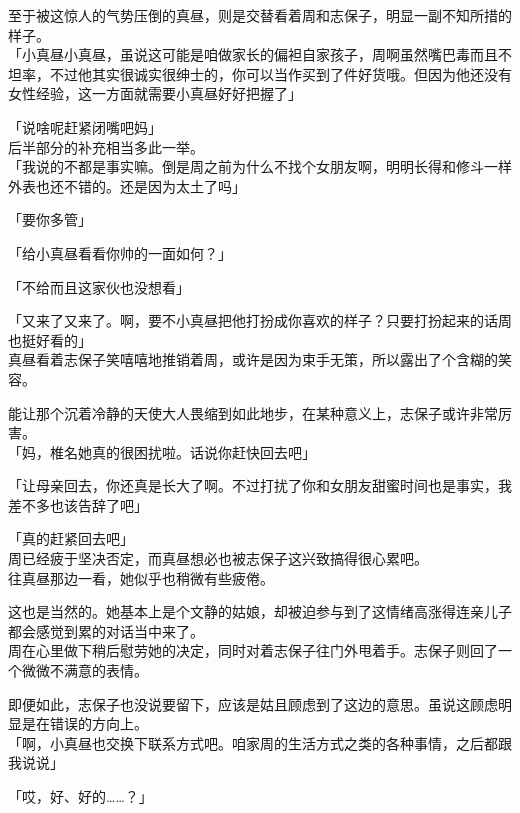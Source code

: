 至于被这惊人的气势压倒的真昼，则是交替看着周和志保子，明显一副不知所措的样子。\\

「小真昼小真昼，虽说这可能是咱做家长的偏袒自家孩子，周啊虽然嘴巴毒而且不坦率，不过他其实很诚实很绅士的，你可以当作买到了件好货哦。但因为他还没有女性经验，这一方面就需要小真昼好好把握了」

「说啥呢赶紧闭嘴吧妈」\\

后半部分的补充相当多此一举。\\

「我说的不都是事实嘛。倒是周之前为什么不找个女朋友啊，明明长得和修斗一样外表也还不错的。还是因为太土了吗」

「要你多管」

「给小真昼看看你帅的一面如何？」

「不给而且这家伙也没想看」

「又来了又来了。啊，要不小真昼把他打扮成你喜欢的样子？只要打扮起来的话周也挺好看的」\\

真昼看着志保子笑嘻嘻地推销着周，或许是因为束手无策，所以露出了个含糊的笑容。

能让那个沉着冷静的天使大人畏缩到如此地步，在某种意义上，志保子或许非常厉害。\\

「妈，椎名她真的很困扰啦。话说你赶快回去吧」

「让母亲回去，你还真是长大了啊。不过打扰了你和女朋友甜蜜时间也是事实，我差不多也该告辞了吧」

「真的赶紧回去吧」\\

周已经疲于坚决否定，而真昼想必也被志保子这兴致搞得很心累吧。\\

往真昼那边一看，她似乎也稍微有些疲倦。

这也是当然的。她基本上是个文静的姑娘，却被迫参与到了这情绪高涨得连亲儿子都会感觉到累的对话当中来了。\\

周在心里做下稍后慰劳她的决定，同时对着志保子往门外甩着手。志保子则回了一个微微不满意的表情。

即便如此，志保子也没说要留下，应该是姑且顾虑到了这边的意思。虽说这顾虑明显是在错误的方向上。\\

「啊，小真昼也交换下联系方式吧。咱家周的生活方式之类的各种事情，之后都跟我说说」

「哎，好、好的……？」\\

